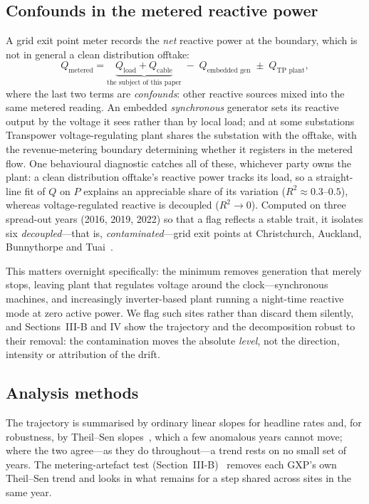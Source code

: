 \documentclass[journal]{IEEEtran}
\begin{document}
\subsection{Confounds in the metered reactive power}
A grid exit point meter records the \emph{net} reactive power at the boundary, which
is not in general a clean distribution offtake:
\begin{equation*}
Q_{\text{metered}} = \underbrace{Q_{\text{load}} + Q_{\text{cable}}}_{\text{the subject of this paper}}
\;-\; Q_{\text{embedded gen}} \;\pm\; Q_{\text{TP plant}},
\end{equation*}
where the last two terms are \emph{confounds}: other reactive sources mixed
into the same metered reading. An embedded
\emph{synchronous} generator sets its reactive output by the voltage it sees
rather than by local load; and at some substations Transpower voltage-regulating
plant shares the substation with the offtake, with the revenue-metering boundary
determining whether it registers in the metered flow. One behavioural diagnostic catches all of
these, whichever party owns the plant: a clean distribution offtake's reactive
power tracks its load, so a straight-line fit of $Q$ on $P$ explains an appreciable
share of its variation ($R^2 \approx 0.3$--$0.5$), whereas voltage-regulated reactive
is decoupled ($R^2 \to 0$). Computed on three spread-out years (2016, 2019, 2022)
so that a flag reflects a stable trait, it isolates six \emph{decoupled}---that is,
\emph{contaminated}---grid exit points at Christchurch, Auckland, Bunnythorpe and
Tuai~\cite{hume_extended}.

This matters overnight specifically: the minimum removes generation that merely
stops, leaving plant that regulates voltage around the clock---synchronous
machines, and increasingly inverter-based plant running a night-time reactive mode
at zero active power. We flag such sites rather than discard them silently, and
Sections~III-B and IV show the trajectory and the decomposition robust to their
removal: the contamination moves the absolute \emph{level}, not the direction,
intensity or attribution of the drift.

\subsection{Analysis methods}
The trajectory is summarised by ordinary linear slopes for headline rates and, for
robustness, by Theil--Sen slopes~\cite{sen1968}, which a few anomalous years cannot
move; where the two agree---as they do throughout---a trend rests on no small set
of years. The metering-artefact test (Section~III-B)~\cite{hume_extended} removes
each GXP's own Theil--Sen trend and looks in what remains for a step shared across
sites in the same year.
\end{document}
